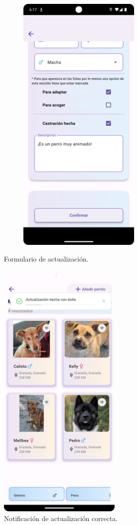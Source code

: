 \documentclass[a4paper, 12pt]{article}
\begin{document}
\begin{figure}[H]
\begin{subfigure}{0.48\textwidth}
\begin{center}
			{\includegraphics[width=6cm]{app/DogUpdate2.png}\par}

		\end{center}  
	\end{subfigure}\hfill
	\caption{Formulario de actualización.}
\end{figure}

\begin{figure}[H]
	\begin{center}
		{\includegraphics[width=6cm]{app/DogUpdateSuccesss.png}\par}
		\caption{Notificación de actualización correcta.}
	\end{center}  
\end{figure}
\end{document}
